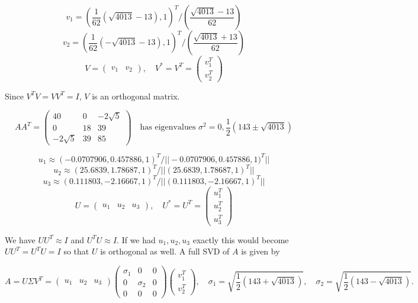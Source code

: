 \documentclass{article}
\begin{document}
$$
v_1 = \left(\frac{1}{62}\left(\sqrt{4013} - 13\right), 1\right)^T / \left(\frac{\sqrt{4013} - 13}{62}\right)
$$
$$
v_2 = \left(\frac{1}{62}\left(-\sqrt{4013} - 13\right), 1\right)^T / \left(\frac{\sqrt{4013} + 13}{62}\right)
$$
$$
V = \begin{pmatrix}
v_1 & v_2 
\end{pmatrix}, \quad V^* = V^T = \begin{pmatrix}
v_1^T \\ v_2^T
\end{pmatrix}
$$

Since $V^T V = VV^T = I$, $V$ is an orthogonal matrix.

$$
AA^T = \begin{pmatrix}
40 & 0 & -2\sqrt{5} \\ 0 & 18 & 39 \\ -2\sqrt{5} & 39 & 85
\end{pmatrix} \quad \text{has eigenvalues } \sigma^2 = 0,  \frac{1}{2}(143 \pm \sqrt{4013})
$$

$$
u_1 \approx (-0.0707906, 0.457886, 1)^T / ||-0.0707906, 0.457886, 1)^T||
$$
$$
u_2 \approx (25.6839, 1.78687, 1)^T / ||(25.6839, 1.78687, 1)^T||
$$
$$
u_3 \approx (0.111803, -2.16667, 1)^T / ||(0.111803, -2.16667, 1)^T||
$$
$$
U = \begin{pmatrix}
u_1 & u_2 & u_3
\end{pmatrix}, \quad U^* = U^T = \begin{pmatrix}
u_1^T \\ u_2^T \\ u_3^T
\end{pmatrix}
$$

We have $UU^T \approx I$ and $U^TU \approx I$. If we had $u_1, u_2, u_3$ exactly this would become $UU^T = U^TU = I$ so that $U$ is orthogonal as well. A full SVD of $A$ is given by

$$
A = U \Sigma V^T = \begin{pmatrix}
u_1 & u_2 & u_3 
\end{pmatrix}
\begin{pmatrix}
\sigma_1 & 0 & 0 \\
0 & \sigma_2 & 0 \\
0 & 0 & 0
\end{pmatrix}
\begin{pmatrix}
v_1^T \\ v_2^T
\end{pmatrix}, \quad
\sigma_1 = \sqrt{\frac{1}{2}\left(143+\sqrt{4013}\right)}, \quad \sigma_2 = \sqrt{\frac{1}{2}\left(143-\sqrt{4013}\right)}.
$$
\end{document}
